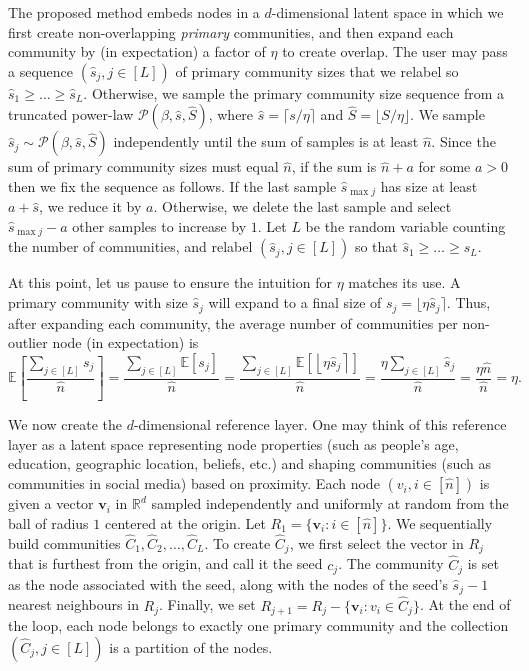 \documentclass[review,los,12pt]{ryethesis}
\newcommand{\R}{{\mathbb R}}
\newcommand{\E}{{\mathbb E}}
\newcommand{\round}[1]{\ensuremath{\left\lfloor #1 \right\rceil}}
\newcommand{\tpl}[3]{\ensuremath{\mathcal{P}\left(#1,#2,#3\right)}}
\begin{document}
The proposed method embeds nodes in a $d$-dimensional latent space in which we first create non-overlapping \textit{primary} communities, and then expand each community by (in expectation) a factor of $\eta$ to create overlap.
The user may pass a sequence $(\hat{s}_j, j \in [L])$ of primary community sizes that we relabel so $\hat{s}_1 \geq \dots \geq \hat{s}_L$.
Otherwise, we sample the primary community size sequence from a truncated power-law $\tpl{\beta}{\hat{s}}{\hat{S}}$, where $\hat{s} = \lceil s / \eta \rceil$ and $\hat{S} = \lfloor S / \eta \rfloor$.
We sample $\hat{s}_j \sim \tpl{\beta}{\hat{s}}{\hat{S}}$ independently until the sum of samples is at least $\hat{n}$.
Since the sum of primary community sizes must equal $\hat{n}$, if the sum is $\hat{n} + a$ for some $a > 0$ then we fix the sequence as follows.
If the last sample $\hat{s}_{\max j}$ has size at least $a + \hat{s}$, we reduce it by $a$. Otherwise, we delete the last sample and select $\hat{s}_{\max j} - a$ other samples to increase by $1$.
Let $L$ be the random variable counting the number of communities, and relabel $(\hat{s}_j, j \in [L])$ so that $\hat{s}_1 \geq \dots \geq \hat{s}_L$.

At this point, let us pause to ensure the intuition for $\eta$ matches its use.
A primary community with size $\hat{s}_j$ will expand to a final size of $s_j = \lfloor \eta \hat{s}_j \rceil$.
Thus, after expanding each community, the average number of communities per non-outlier node (in expectation) is
\begin{equation}
\E\left[\frac{\sum_{j \in [L]} s_j}{\hat{n}}\right]
= \frac{\sum_{j \in [L]} \E[s_j]}{\hat{n}}
= \frac{\sum_{j \in [L]} \E\left[\round{\eta \hat{s}_j}\right]}{\hat{n}}
= \frac{\eta \sum_{j \in [L]} \hat{s}_j}{\hat{n}}
= \frac{\eta \hat{n}}{\hat{n}}
= \eta.
\end{equation}

We now create the $d$-dimensional reference layer.
One may think of this reference layer as a latent space representing node properties (such as people's age, education, geographic location, beliefs, etc.) and shaping communities (such as communities in social media) based on proximity.
Each node $(v_i, i \in [\hat{n}])$ is given a vector $\mathbf{v}_i$ in $\R^d$ sampled independently and uniformly at random from the ball of radius $1$ centered at the origin.
Let $R_1 = \{\mathbf{v}_i: i \in [\hat{n}]\}$.
We sequentially build communities $\hat{C}_{1}, \hat{C}_{2},\ldots, \hat{C}_L$.
To create $\hat{C}_{j}$, we first select the vector in $R_{j}$ that is furthest from the origin, and call it the seed $c_j$.
The community $\hat{C}_j$ is set as the node associated with the seed, along with the nodes of the seed's $\hat{s}_j - 1$ nearest neighbours in $R_j$.
Finally, we set $R_{j+1} = R_j - \{\mathbf{v}_i: v_i \in \hat{C}_j\}$.
At the end of the loop, each node belongs to exactly one primary community and the collection $(\hat{C}_j, j \in [L])$ is a partition of the nodes.
\end{document}
